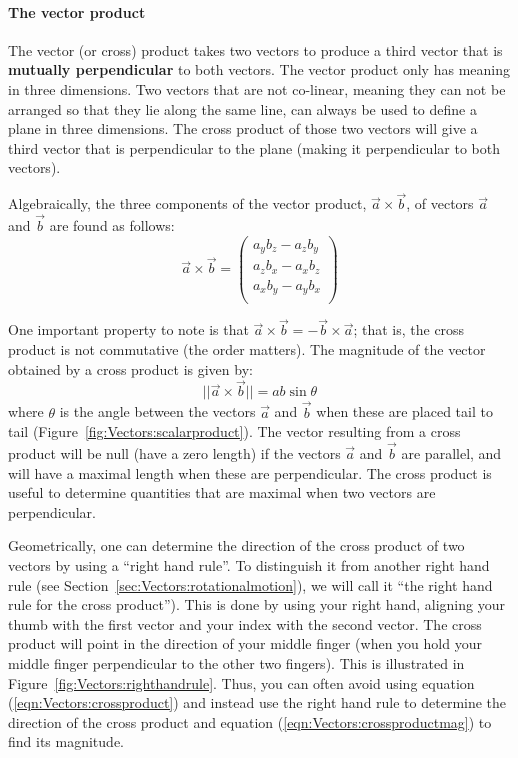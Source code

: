 \paragraph{The vector product}\label{sec:Vectors:vectorproduct}

The vector (or cross) product takes two vectors to produce a third vector that is \textbf{mutually perpendicular} to both vectors. The vector product only has meaning in three dimensions. Two vectors that are not co-linear, meaning they can not be arranged so that they lie along the same line, can always be used to define a plane in three dimensions. The cross product of those two vectors will give a third vector that is perpendicular to the plane (making it perpendicular to both vectors).

Algebraically, the three components of the vector product, $\vec a\times \vec b$, of vectors $\vec a$ and $\vec b$ are found as follows:
\begin{equation}
\label{eqn:Vectors:crossproduct}
\vec a \times \vec b =\begin{pmatrix}
           a_yb_z - a_z b_y\\
           a_zb_x - a_x b_z\\
           a_xb_y - a_y b_x\\
         \end{pmatrix}
\end{equation}

One important property to note is that $\vec a \times \vec b = -\vec b \times \vec a$; that is, the cross product is not commutative (the order matters). The magnitude of the vector obtained by a cross product is given by:
\begin{equation}
\label{eqn:Vectors:crossproductmag}
||\vec a \times \vec b ||=ab\sin\theta
\end{equation}
where $\theta$ is the angle between the vectors $\vec a$ and $\vec b$ when these are placed tail to tail (Figure~\ref{fig:Vectors:scalarproduct}). The vector resulting from a cross product will be null (have a zero length) if the vectors $\vec a$ and $\vec b$ are parallel, and will have a maximal length when these are perpendicular. The cross product is useful to determine quantities that are maximal when two vectors are perpendicular.

Geometrically, one can determine the direction of the cross product of two vectors by using a ``right hand rule''. To distinguish it from another right hand rule (see Section~\ref{sec:Vectors:rotationalmotion}), we will call it ``the right hand rule for the cross product''). This is done by using your right hand, aligning your thumb with the first vector and your index with the second vector. The cross product will point in the direction of your middle finger (when you hold your middle finger perpendicular to the other two fingers). This is illustrated in Figure~\ref{fig:Vectors:righthandrule}. Thus, you can often avoid using equation (\ref{eqn:Vectors:crossproduct}) and instead use the right hand rule to determine the direction of the cross product and equation (\ref{eqn:Vectors:crossproductmag}) to find its magnitude.

